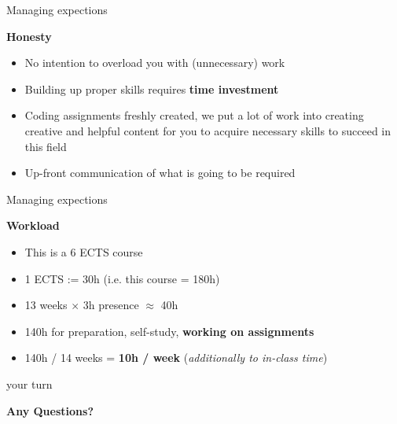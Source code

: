 \begin{vbframe}{Managing expections}

\vfill

\textbf{Honesty}

	\begin{itemize}
		\item No intention to overload you with (unnecessary) work
		\item Building up proper skills requires \textbf{time investment}
		\item Coding assignments freshly created, we put a lot of work into creating creative and helpful content for you to acquire necessary skills to succeed in this field
		\item Up-front communication of what is going to be required
	\end{itemize}
\vfill

\end{vbframe}


\begin{vbframe}{Managing expections}

\vfill

\textbf{Workload}

	\begin{itemize}
		\item This is a 6 ECTS course
		\item 1 ECTS := 30h (i.e. this course = 180h)
		\item 13 weeks $\times$ 3h presence $\approx$ 40h
		\item 140h for preparation, self-study, \textbf{working on assignments} 
		\item 140h / 14 weeks = \textbf{10h / week} (\textit{additionally to in-class time})
	\end{itemize}


\vfill

\end{vbframe}


\begin{vbframe}{your turn}

\vfill

\centering \Huge{\bf Any Questions?}

\vfill

\end{vbframe}

